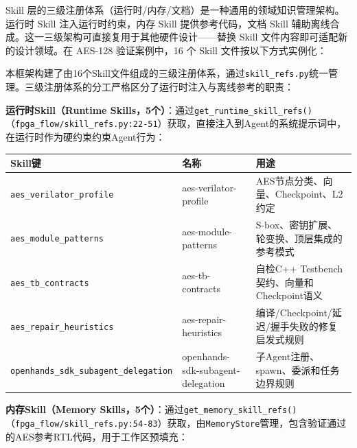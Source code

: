 Skill
层的三级注册体系（运行时/内存/文档）是一种通用的领域知识管理架构。运行时
Skill 注入运行时约束，内存 Skill 提供参考代码，文档 Skill
辅助离线合成。这一三级架构可直接复用于其他硬件设计------替换 Skill
文件内容即可适配新的设计领域。在 AES-128 验证案例中，16 个 Skill
文件按以下方式实例化：

本框架构建了由16个Skill文件组成的三级注册体系，通过\texttt{skill\_refs.py}统一管理。三级注册体系的分工严格区分了运行时注入与离线参考的职责：

\textbf{运行时Skill（Runtime
Skills，5个）}：通过\texttt{get\_runtime\_skill\_refs()}（\texttt{fpga\_flow/skill\_refs.py:22-51}）获取，直接注入到Agent的系统提示词中，在运行时作为硬约束约束Agent行为：

{\def\LTcaptype{none} %
\begin{longtable}[]{@{}
  >{\raggedright\arraybackslash}p{}
  >{\raggedright\arraybackslash}p{}
  >{\raggedright\arraybackslash}p{}@{}}
\toprule\noalign{}
\begin{minipage}[b]{\linewidth}\raggedright
Skill键
\end{minipage} & \begin{minipage}[b]{\linewidth}\raggedright
名称
\end{minipage} & \begin{minipage}[b]{\linewidth}\raggedright
用途
\end{minipage} \\
\midrule\noalign{}
\endhead
\bottomrule\noalign{}
\endlastfoot
\texttt{aes\_verilator\_profile} & aes-verilator-profile &
AES节点分类、向量、Checkpoint、L2约定 \\
\texttt{aes\_module\_patterns} & aes-module-patterns &
S-box、密钥扩展、轮变换、顶层集成的参考模式 \\
\texttt{aes\_tb\_contracts} & aes-tb-contracts & 自检C++
Testbench契约、向量和Checkpoint语义 \\
\texttt{aes\_repair\_heuristics} & aes-repair-heuristics &
编译/Checkpoint/延迟/握手失败的修复启发式规则 \\
\texttt{openhands\_sdk\_subagent\_delegation} &
openhands-sdk-subagent-delegation &
子Agent注册、spawn、委派和任务边界规则 \\
\end{longtable}
}

\textbf{内存Skill（Memory
Skills，5个）}：通过\texttt{get\_memory\_skill\_refs()}（\texttt{fpga\_flow/skill\_refs.py:54-83}）获取，由\texttt{MemoryStore}管理，包含验证通过的AES参考RTL代码，用于工作区预填充：

